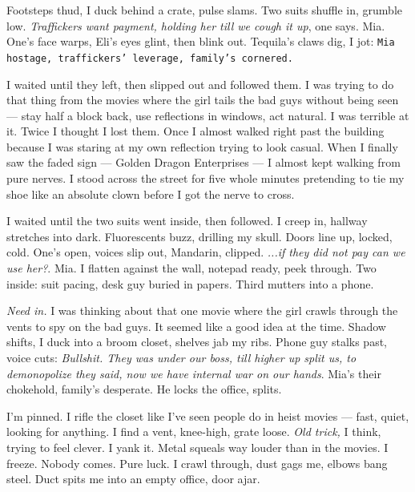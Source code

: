 \documentclass[12pt,oneside]{book}
\newcommand{\note}[1]{\texttt{#1}}
\begin{document}
Footsteps thud, I duck behind a crate, pulse slams. Two suits shuffle in, grumble low. \textit{Traffickers want payment, holding her till we cough it up}, one says. Mia. One’s face warps, \textnormal{Eli}’s eyes glint, then blink out. Tequila’s claws dig, I jot: \note{Mia hostage, traffickers’ leverage, family’s cornered.} 

I waited until they left, then slipped out and followed them. I was trying to do that thing from the movies where the girl tails the bad guys without being seen — stay half a block back, use reflections in windows, act natural. I was terrible at it. Twice I thought I lost them. Once I almost walked right past the building because I was staring at my own reflection trying to look casual. When I finally saw the faded sign — Golden Dragon Enterprises — I almost kept walking from pure nerves. I stood across the street for five whole minutes pretending to tie my shoe like an absolute clown before I got the nerve to cross.

I waited until the two suits went inside, then followed. I creep in, hallway stretches into dark. Fluorescents buzz, drilling my skull. Doors line up, locked, cold. One’s open, voices slip out, Mandarin, clipped. \textit{...if they did not pay can we use her?}. Mia. I flatten against the wall, notepad ready, peek through. Two inside: suit pacing, desk guy buried in papers. Third mutters into a phone.

\textit{Need in.} I was thinking about that one movie where the girl crawls through the vents to spy on the bad guys. It seemed like a good idea at the time. Shadow shifts, I duck into a broom closet, shelves jab my ribs. Phone guy stalks past, voice cuts: \textit{Bullshit. They was under our boss, till higher up split us, to demonopolize they said, now we have internal war on our hands}. Mia’s their chokehold, family’s desperate. He locks the office, splits. 

I’m pinned. I rifle the closet like I’ve seen people do in heist movies — fast, quiet, looking for anything. I find a vent, knee-high, grate loose. \textit{Old trick,} I think, trying to feel clever. I yank it. Metal squeals way louder than in the movies. I freeze. Nobody comes. Pure luck. I crawl through, dust gags me, elbows bang steel. Duct spits me into an empty office, door ajar.
\end{document}
